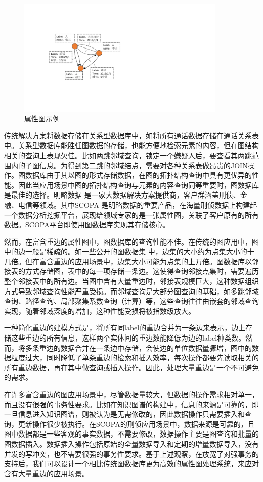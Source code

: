\begin{figure}[htbp]
\centering
\includegraphics[width=100mm]{fig/property_graph.pdf}
\caption{属性图示例}
\label{fig:property_graph}
\end{figure}

传统解决方案将数据存储在关系型数据库中，如将所有通话数据存储在通话关系表中。关系型数据库能胜任图数据的存储，也能方便地检索元素的内容，但在图结构相关的查询上表现欠佳。比如两跳邻域查询，锁定一个嫌疑人后，要查看其两跳范围内的子图信息。为得到第二跳的邻域结点，需要对各种关系表做昂贵的JOIN操作。图数据库由于其以图的形式存储数据，在图的拓扑结构查询中具有更优异的性能。因此当应用场景中图的拓扑结构查询与元素的内容查询同等重要时，图数据库是最佳的选择。明略数据 是一家大数据解决方案提供商，客户群涵盖刑侦、金融、电信等领域。其中SCOPA 是明略数据的重要产品，在海量刑侦数据上构建起一个数据分析挖掘平台，展现给领域专家的是一张属性图，关联了客户原有的所有数据。SCOPA平台即使用图数据库实现其存储核心。

然而，在富含重边的属性图中，图数据库的查询性能不佳。在传统的图应用中，图中的边一般是稀疏的。如一些公开的图数据集 中，边集的大小约为点集大小的十几倍。但在富含重边的应用场景中，边集大小可能为点集的上万倍。图数据库以邻接表的方式存储图，表中的每一项存储一条边。这使得查询邻接点集时，需要遍历整个邻接表中的所有边。当图中含有大量重边时，邻接表规模巨大，这种数据组织方式导致邻域查询性能严重受损。而邻域查询是大部分图查询的基础，如多跳邻域查询、路径查询、局部聚集系数查询（计算）等，这些查询往往由嵌套的邻域查询实现，随着邻域深度的增加，这种性能受损将被指数级放大。

一种简化重边的建模方式是，将所有同label的重边合并为一条边来表示，边上存储这些重边的所有信息，这样两个实体间的重边数能降低为边的label种类数。然而，将多条重边的数据合并在一条边中存储，会使边的单位数据量骤增，图中的数据粒度过大，同时降低了单条重边的检索和插入效率，每次操作都要先读取相关的所有重边数据，再在其中做查询或插入操作。因此，处理大量重边是一个不可避免的需求。

在许多富含重边的图应用场景中，尽管数据量较大，但数据的操作需求相对单一，而且没有很强的事务性要求。比如在知识图谱的构建中\supercite{knowledge_graph}，信息的来源是可靠的，即一旦信息进入知识图谱，则被认为是无需修改的，因此数据操作只需要插入和查询，更新操作很少被执行。在SCOPA的刑侦应用场景中，数据来源是可靠的，且图中数据都是一些客观的事实数据，不需要修改，数据操作主要是图查询和批量的图数据插入。数据插入操作包括原始的全量数据导入和定期的增量数据导入，没有并发的写冲突，也不需要很强的事务性要求。基于上述观察，在放宽了对强事务的支持后，我们可以设计一个相比传统图数据库更为高效的属性图处理系统，来应对含有大量重边的应用场景。

